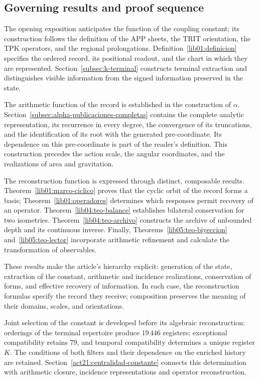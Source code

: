 \subsection*{Governing results and proof sequence}
\label{paper:resultados-rectores}
The opening exposition anticipates the function of the coupling constant;
its construction follows the definition of the APP sheets, the
TRIT orientation, the TPK operators, and the regional prolongations.
Definition~\ref{lib01:definicion} specifies the ordered record, its
positional readout, and the chart in which they are represented.
Section~\ref{subsec:k-terminal} constructs terminal extraction and distinguishes
visible information from the signed information preserved in the state.

The arithmetic function of the record is established in the construction of
\(\alpha\). Section~\ref{subsec:alpha-publicaciones-completas} contains
the complete analytic representation, its recurrence in every degree,
the convergence of its truncations, and the identification of its root with the
generated pre-coordinate. Its dependence on this pre-coordinate is part of
the reader's definition. This construction precedes the action scale,
the angular coordinates, and the realizations of area and gravitation.

The reconstruction function is expressed through distinct, composable
results. Theorem~\ref{lib01:marco-ciclico} proves that the
cyclic orbit of the record forms a basis;
Theorem~\ref{lib01:operadores} determines which responses permit
recovery of an operator. Theorem~\ref{lib04:teo-balance} establishes
bilateral conservation for two isometries.
Theorem~\ref{lib04:teo-archivo} constructs the archive of unbounded
depth and its continuous inverse. Finally,
Theorems~\ref{lib05:teo-biyeccion} and~\ref{lib05:teo-lector} incorporate
arithmetic refinement and calculate the transformation of observables.

These results make the article's hierarchy explicit: generation of the
state, extraction of the constant, arithmetic and incidence
realizations, conservation of forms, and effective recovery of
information. In each case, the reconstruction formulas specify the
record they receive; composition preserves the meaning of their
domains, scales, and orientations.

Joint selection of the constant is developed before its algebraic
reconstruction: orderings of the terminal repertoire produce \(19\,446\)
registers; exceptional compatibility retains \(79\), and temporal
compatibility determines a unique register \(K\). The conditions of both
filters and their dependence on the enriched history are retained.
Section~\ref{act21:centralidad-constante} connects this determination with
arithmetic closure, incidence representations and operator reconstruction.
